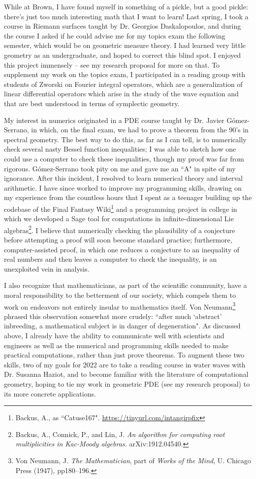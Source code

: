 \documentclass[12pt]{article}
\begin{document}
While at Brown, I have found myself in something of a pickle, but a good pickle: there's just too much interesting math that I want to learn!
Last spring, I took a course in Riemann surfaces taught by Dr. Georgios Daskalopoulos, and during the course I asked if he could advise me for my topics exam the following semester, which would be on geometric measure theory.
I had learned very little geometry as an undergraduate, and hoped to correct this blind spot.
I enjoyed this project immensely -- see my research proposal for more on that.
To supplement my work on the topics exam, I participated in a reading group with students of Zworski on Fourier integral operators, which are a generalization of linear differential operators which arise in the study of the wave equation and that are best understood in terms of symplectic geometry.

My interest in numerics originated in a PDE course taught by Dr. Javier G\'omez-Serrano, in which, on the final exam, we had to prove a theorem from the 90's in spectral geometry.
The best way to do this, as far as I can tell, is to numerically check several nasty Bessel function inequalities; I was able to sketch how one could use a computer to check these inequalities, though my proof was far from rigorous.
G\'omez-Serrano took pity on me and gave me an ``A" in spite of my ignorance.
After this incident, I resolved to learn numerical theory and interval arithmetic.
I have since worked to improve my programming skills, drawing on my experience from the countless hours that I spent as a teenager building up the codebase of the Final Fantasy Wiki\footnote{Backus, A., as ``Catuse167". \url{https://tinyurl.com/intangirpfix}}
and a programming project in college in which we developed a Sage tool for computations in infinite-dimensional Lie algebras\footnote{Backus, A., Connick, P., and Lin, J. \emph{An algorithm for computing root multiplicities in Kac-Moody algebras.} arXiv:1912.04540.}.
I believe that numerically checking the plausibility of a conjecture before attempting a proof will soon become standard practice; furthermore, computer-assisted proof, in which one reduces a conjecture to an inequality of real numbers and then leaves a computer to check the inequality, is an unexploited vein in analysis.

I also recognize that mathematicians, as part of the scientific community, have a moral responsibility to the betterment of our society, which compels them to work on endeavors not entirely insular to mathematics itself.
Von Neumann\footnote{Von Neumann, J. \emph{The Mathematician}, part of \emph{Works of the Mind}, U. Chicago Press (1947), pp180--196.} phrased this observation somewhat more crudely: ``after much `abstract' inbreeding, a mathematical subject is in danger of degeneration".
As discussed above, I already have the ability to communicate well with scientists and engineers as well as the numerical and programming skills needed to make practical computations, rather than just prove theorems.
To augment these two skills, two of my goals for 2022 are to take a reading course in water waves with Dr. Susanna Haziot, and to become familiar with the literature of computational geometry, hoping to tie my work in geometric PDE (see my research proposal) to its more concrete applications.
\end{document}

